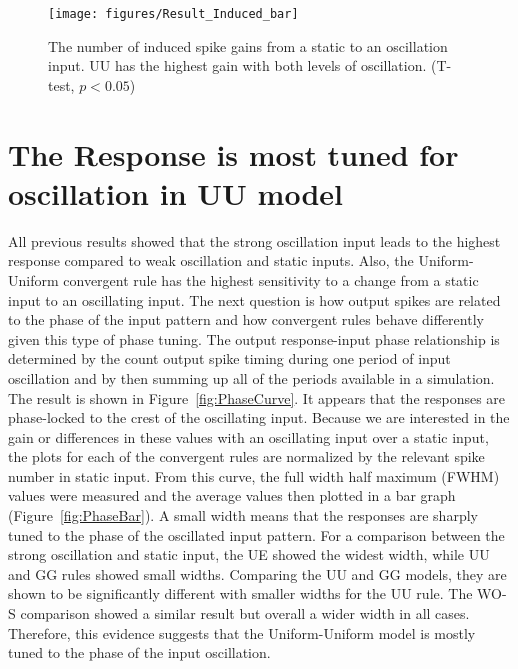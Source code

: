 \begin{figure}[!h]
	\centering
	\texttt{[image: figures/Result\_Induced\_bar]}
	\caption[The number of induced spike]{The number of induced spike gains from a static to an oscillation input. UU has the highest gain with both levels of oscillation. (T-test, $p < 0.05$)} %
	\label{fig:InduceBar}
\end{figure}

\section[Tuning Output for Oscillating Input]{The Response is most tuned for oscillation in UU model}
 All previous results showed that the strong oscillation input leads to the highest response compared to weak oscillation and static inputs. Also, the Uniform-Uniform convergent rule has the highest sensitivity to a change from a static input to an oscillating input. 
The next question is how output spikes are related to the phase of the input pattern and how convergent rules behave differently given this type of phase tuning. 
The output response-input phase relationship is determined by the count output spike timing during one period of input oscillation and by then summing up all of the periods available in a simulation. The result is shown in Figure~\ref{fig:PhaseCurve}. It appears that the responses are phase-locked to the crest of the oscillating input.
Because we are interested in the gain or differences in these values with an oscillating input over a static input, the plots for each of the convergent rules are normalized by the relevant spike number in static input. From this curve, the full width half maximum (FWHM) values were measured and the average values then plotted in a bar graph (Figure~\ref{fig:PhaseBar}). A small width means that the responses are sharply tuned to the phase of the oscillated input pattern. For a comparison between the strong oscillation and static input, the UE showed the widest width, while UU and GG rules showed small widths. Comparing the UU and GG models, they are shown to be significantly different with smaller widths for the UU rule. The WO-S comparison showed a similar result but overall a wider width in all cases. Therefore, this evidence suggests that the Uniform-Uniform model is mostly tuned to the phase of the input oscillation.




